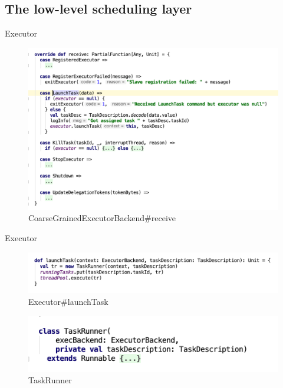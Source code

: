 \subsection{The low-level scheduling layer}
\begin{frame}[plain,t]{Executor} %
	 \\  \vspace{2ex}
	\begin{figure}
		\centering
		\includegraphics[width=0.9\linewidth]{images/executor001}
		\caption{CoarseGrainedExecutorBackend\#receive}
		\label{fig:executor001}
	\end{figure}
	
	
\end{frame}
\begin{frame}[plain,t]{Executor} %
	 \\  \vspace{2ex}
	\begin{figure}
		\centering
		\includegraphics[width=0.9\linewidth]{images/executor002}
		\caption{Executor\#launchTask}
		\label{fig:executor002}
	\end{figure}

  \begin{figure}
  	\centering
  	\includegraphics[width=0.9\linewidth]{images/executor003}
  	\caption{TaskRunner}
  	\label{fig:executor003}
  \end{figure}
  
\end{frame}
